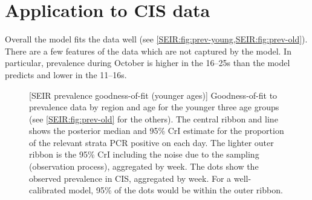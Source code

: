 \documentclass[thesis.tex]{subfiles}
\begin{document}

\section{Application to CIS data} \label{SEIR:sec:application}



Overall the model fits the data well (see \cref{SEIR:fig:prev-young,SEIR:fig:prev-old}).
There are a few features of the data which are not captured by the model.
In particular, prevalence during October is higher in the 16--25s than the model predicts and lower in the 11--16s.
\begin{figure}
    \vspace{-3cm}
    \captionsetup{width=0.8\paperwidth}
    [SEIR prevalence goodness-of-fit (younger ages)]{%
        Goodness-of-fit to prevalence data by region and age for the younger three age groups (see \cref{SEIR:fig:prev-old} for the others).
        The central ribbon and line shows the posterior median and 95\% CrI estimate for the proportion of the relevant strata PCR positive on each day.
        The lighter outer ribbon is the 95\% CrI including the noise due to the sampling (\ie observation process), aggregated by week.
        The dots show the observed prevalence in CIS, aggregated by week.
        For a well-calibrated model, 95\% of the dots would be within the outer ribbon.
    }
    \label{SEIR:fig:prev-young}
\end{figure}
\end{document}
